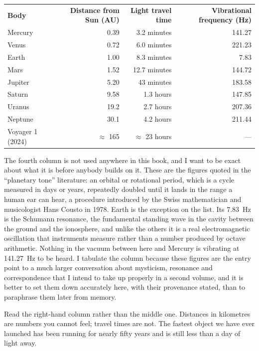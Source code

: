 \begin{center}\small
\setlength{\tabcolsep}{0.6em}
\begin{tabular}{l r r r}
\textbf{Body} & \textbf{Distance from Sun (AU)} & \textbf{Light travel time} & \textbf{Vibrational frequency (Hz)}\\[2pt]
Mercury & 0.39 & 3.2 minutes & 141.27\\
Venus & 0.72 & 6.0 minutes & 221.23\\
Earth & 1.00 & 8.3 minutes & 7.83\\
Mars & 1.52 & 12.7 minutes & 144.72\\
Jupiter & 5.20 & 43 minutes & 183.58\\
Saturn & 9.58 & 1.3 hours & 147.85\\
Uranus & 19.2 & 2.7 hours & 207.36\\
Neptune & 30.1 & 4.2 hours & 211.44\\
Voyager 1 (2024) & $\approx$ 165 & $\approx$ 23 hours & ---\\
\end{tabular}
\end{center}

The fourth column is not used anywhere in this book, and I want to be exact about what
it is before anybody builds on it. These are the figures quoted in the ``planetary tone''
literature: an orbital or rotational period, which is a cycle measured in days or years,
repeatedly doubled until it lands in the range a human ear can hear, a procedure introduced
by the Swiss mathematician and musicologist Hans Cousto in 1978. Earth is the exception on
the list. Its 7.83~Hz is the Schumann resonance, the fundamental standing wave in the cavity
between the ground and the ionosphere, and unlike the others it is a real electromagnetic
oscillation that instruments measure rather than a number produced by octave arithmetic.
Nothing in the vacuum between here and Mercury is vibrating at 141.27~Hz to be heard. I
tabulate the column because these figures are the entry point to a much larger conversation
about mysticism, resonance and correspondence that I intend to take up properly in a second
volume, and it is better to set them down accurately here, with their provenance stated,
than to paraphrase them later from memory.

Read the right-hand column rather than the middle one. Distances in kilometres are numbers you
cannot feel; travel times are not. The fastest object we have ever launched has been running
for nearly fifty years and is still less than a day of light away. 

